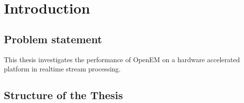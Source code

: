 \chapter{Introduction}
 \label{chapter:intro}

\section{Problem statement}
\label{section:problemofficer}
This thesis investigates the performance of OpenEM on a hardware accelerated
platform in realtime stream processing. 

\section{Structure of the Thesis} \label{section:structure}

